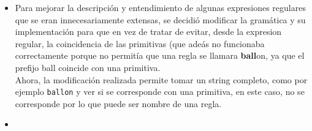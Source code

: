 \begin{itemize}
\item Para mejorar la descripci\'on y entendimiento de algunas expresiones regulares que se eran innecesariamente extensas, se decidi\'o modificar la gram\'atica y su implementaci\'on para que en vez de tratar de evitar, desde la expresion regular, la coincidencia de las primitivas (que ade\'as no funcionaba correctamente porque no permit\'ia que una regla se llamara \textbf{ball}on, ya que el prefijo ball coincide con una primitiva. \\
Ahora, la modificaci\'on realizada permite tomar un string completo, como por ejemplo \texttt{ballon} y ver si se corresponde con una primitiva, en este caso, no se corresponde por lo que puede ser nombre de una regla.

\item
\end{itemize}



